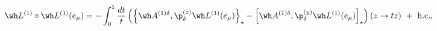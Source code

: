 \begin{equation}
\wh L^{(1)} \circ \wh L^{(1)}(e_\mu) =
- \int_0^1\frac{dt}{t}
\left(\left\{\wh A^{(1)\delta} ,
\p_\delta^{(z)}\wh L^{(1)}(e_\mu) \right\}_\star-\left[\wh A^{(1)\delta} ,
\p_\delta^{(y)}\wh L^{(1)}(e_\mu) \right]_\star\right)(z\to tz) \ + 
\ \mbox{h.c.},
\end{equation} 
